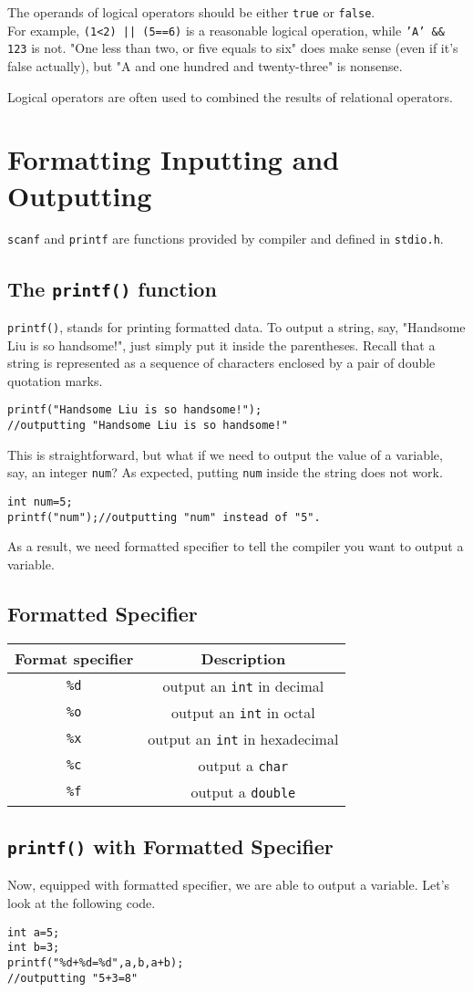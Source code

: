 \documentclass{report}
\begin{document}
    The operands of logical operators should be either \texttt{true} or \texttt{false}. \\
    For example, \texttt{(1<2) || (5==6)} is a reasonable logical operation, while \texttt{'A' \&\& 123} is not. "One less than two, or five equals to six" does make sense (even if it's false actually), but "A and one hundred and twenty-three" is nonsense.

    Logical operators are often used to combined the results of relational operators.
    
\section{Formatting Inputting and Outputting}
    \texttt{scanf} and \texttt{printf} are functions provided by compiler and defined in \texttt{stdio.h}.
    \subsection{The \texttt{printf()} function}
    \texttt{printf()}, stands for printing formatted data. To output a string, say, "Handsome Liu is so handsome!", just simply put it inside the parentheses. Recall that a string is represented as a sequence of characters enclosed by a pair of double quotation marks.
\begin{lstlisting}[style=CStyle]
printf("Handsome Liu is so handsome!");
//outputting "Handsome Liu is so handsome!"
\end{lstlisting}
    This is straightforward, but what if we need to output the value of a variable, say, an integer \texttt{num}? As expected, putting \texttt{num} inside the string does not work.
\begin{lstlisting}[style=CStyle]
int num=5;
printf("num");//outputting "num" instead of "5".
\end{lstlisting}
    As a result, we need formatted specifier to tell the compiler you want to output a variable.
    \subsection{Formatted Specifier}
    \begin{tabular}{|c|c|}
    Format specifier    &   Description\\
    \hline
    \texttt{\%d}        &   output an \texttt{int} in decimal\\
    \texttt{\%o}        &   output an \texttt{int} in octal\\
    \texttt{\%x}        &   output an \texttt{int} in hexadecimal\\
    \texttt{\%c}        &   output a \texttt{char}\\
    \texttt{\%f}        &   output a \texttt{double}\\
    \end{tabular}
    
    \subsection{\texttt{printf()} with Formatted Specifier}
    Now, equipped with formatted specifier, we are able to output a variable. Let's look at the following code.
\begin{lstlisting}[style=CStyle]
int a=5;
int b=3;
printf("%d+%d=%d",a,b,a+b);
//outputting "5+3=8" 
\end{lstlisting} 
\end{document}
